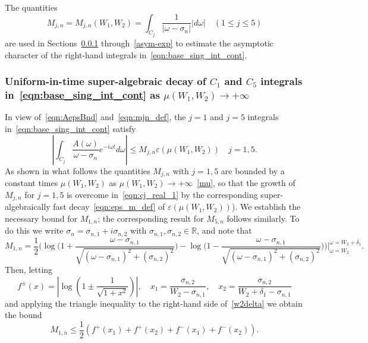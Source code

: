 \documentclass[11pt]{article}
\theoremstyle{plain}
\theoremstyle{remark}
\begin{document}
The quantities
\begin{equation}\label{eqn:mjn_def}
  M_{j,n} = M_{j,n}(W_1,W_2) =\int_{C_j} \frac{1}{|\omega - \sigma_n|}|d\omega| \quad (1\le j \le 5)
\end{equation}
are used in Sections~\ref{sec:C1C5} through~\ref{asym-exp} to estimate
the asymptotic character of the right-hand integrals
in~\eqref{eqn:base_sing_int_cont}.

\subsubsection{Uniform-in-time super-algebraic decay of $C_1$ and $C_5$ integrals in~\eqref{eqn:base_sing_int_cont} as $\mu(W_1,W_2) \to +\infty$}\label{sec:C1C5}
In view of~\eqref{eqn:AepsBnd} and~\eqref{eqn:mjn_def}, the $j = 1$
and $j=5$ integrals in~\eqref{eqn:base_sing_int_cont} satisfy
\begin{equation}\label{eqn:cj_real_1}
  \left|\int_{C_j} \frac{A(\omega)}{\omega - \sigma_n}e^{-i\omega t}d\omega\right|  \le M_{j,n} \varepsilon(\mu(W_1,W_2)) \quad j = 1,5.
\end{equation}
As shown in what follows the quantities  $M_{j,n}$ with $j = 1,5$ are
bounded by a constant times $\mu(W_1,W_2)$ as
$\mu(W_1,W_2)\to +\infty$~\eqref{mu}, so that the growth of $M_{j,n}$
for $j = 1,5$ is overcome in~\eqref{eqn:cj_real_1} by the
corresponding super-algebraically fast decay~\eqref{eqn:eps_m_def} of
$\varepsilon(\mu(W_1,W_2))$). We establish the necessary bound for
$M_{1,n}$; the corresponding result for $M_{5,n}$ follows
similarly. To do this we write $\sigma_n = \sigma_{n,1} + i\sigma_{n,2}$
with $\sigma_{n,1},\sigma_{n,2}\in\mathbb{R}$, and note that 
\begin{equation}\label{w2delta}
  M_{1,n} = \frac{1}{2}\Biggr( \log\Biggl(1 + \frac{\omega - \sigma_{n,1}}{\sqrt{(\omega - \sigma_{n,1})^2 + (\sigma_{n,2})^2}}\Biggr) - \log\Biggl(1 - \frac{\omega - \sigma_{n,1}}{\sqrt{(\omega - \sigma_{n,1})^2 + (\sigma_{n,2})^2}}\Biggr) \Biggr) \Bigg|_{\omega =W_2}^{\omega = W_2 + \delta_1}.
\end{equation}
Then, letting
\begin{equation*}
    f^\pm(x) = \left|\log\left(1 \pm \frac{1}{\sqrt{1 + x^2}}\right)\right|, \quad x_1 = \frac{\sigma_{n,2}}{W_2 - \sigma_{n,1}}, \quad x_2 = \frac{\sigma_{n,2}}{W_2 + \delta_1 - \sigma_{n,1}}
\end{equation*}
and applying the triangle inequality to the right-hand side
of~\eqref{w2delta} we obtain the bound
\begin{equation}\label{eqn:ns_log_bound}
       M_{1,n} \le \frac{1}{2}\left(f^+(x_1) + f^+(x_2) +f^-(x_1) + f^-(x_2) \right).
\end{equation}
\end{document}
